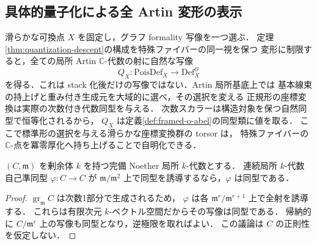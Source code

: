 \subsection{具体的量子化による全 Artin 変形の表示}
\label{subsec:quantization-formal-universal}

滑らかな可換点 $X$ を固定し，グラフ formality 写像を一つ選ぶ．
定理\ref{thm:quantization-descent}の構成を特殊ファイバーの同一視を保つ
変形に制限すると，全ての局所 Artin $\mathbb C$-代数の射に自然な写像
\[
 Q_X:\mathrm{PoisDef}_X\longrightarrow\mathrm{Def}^{\mathcal O}_X
\]
を得る．これは stack 化後だけの写像ではない．Artin 局所基底上では
基本線束の持上げと重み付き生成元を大域的に選べ，その選択を変える
正規形の座標変換は実際の次数付き代数同型を与える．
次数スカラーは構造対象を保つ自然同型で恒等化されるから，
$Q_X$ は定義\ref{def:framed-o-abel}の同型類に値を取る．
ここで標準形の選択を与える滑らかな座標変換群の torsor は，
特殊ファイバーの $\mathbb C$-点を冪零厚化へ持ち上げることで自明化できる．

\begin{lemma}[完備局所環の自己写像]
\label{lem:formal-endomorphism-inverse}
$(C,\mathfrak m)$ を剰余体 $k$ を持つ完備 Noether 局所 $k$-代数とする．
連続局所 $k$-代数自己準同型 $\varphi:C\to C$ が
$\mathfrak m/\mathfrak m^2$ 上で同型を誘導するなら，$\varphi$ は同型である．
\end{lemma}
\begin{proof}
$\operatorname{gr}_{\mathfrak m}C$ は次数1部分で生成されるため，
$\varphi$ は各 $\mathfrak m^r/\mathfrak m^{r+1}$ 上で全射を誘導する．
これらは有限次元 $k$-ベクトル空間だからその写像は同型である．
帰納的に $C/\mathfrak m^r$ 上の写像も同型となり，逆極限を取ればよい．
この議論は $C$ の正則性を仮定しない．
\end{proof}

